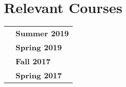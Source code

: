 \documentclass{article}
\begin{document}
\section{Relevant Courses}
\begin{flushleft}
\begin{tabular}{p{15.5cm} p{2.5cm}}

\noindent{Microprocessor Architecture}
    & \textbf{Summer 2019} \\

\noindent{Real Time Systems and Embedded Programming}
    & \textbf{Spring 2019} \\

\noindent{The Fundamentals of Operating Systems}
    & \textbf{Fall 2017} \\

\noindent{Computer Architecture and Organization}
    & \textbf{Spring 2017} \\


\end{tabular}
\end{flushleft}

\iffalse

\section{Awards}
\subsection{Second Place in Digital Systems Final Project (2019)}
\subsection{University of Houston Deans List (2019)}

\fi
\end{document}
